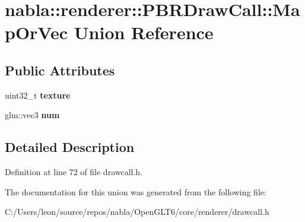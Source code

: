 \hypertarget{unionnabla_1_1renderer_1_1_p_b_r_draw_call_1_1_map_or_vec}{}\section{nabla\+::renderer\+::P\+B\+R\+Draw\+Call\+::Map\+Or\+Vec Union Reference}
\label{unionnabla_1_1renderer_1_1_p_b_r_draw_call_1_1_map_or_vec}
\subsection*{Public Attributes}
\begin{DoxyCompactItemize}
\item 
\mbox{\label{unionnabla_1_1renderer_1_1_p_b_r_draw_call_1_1_map_or_vec_aa236c46d7e6d9e0082750c23fa6f1032}} 
uint32\+\_\+t {\bfseries texture}
\item 
\mbox{\label{unionnabla_1_1renderer_1_1_p_b_r_draw_call_1_1_map_or_vec_a7c1648639446b1d83b3bab69740503d4}} 
glm\+::vec3 {\bfseries num}
\end{DoxyCompactItemize}


\subsection{Detailed Description}


Definition at line 72 of file drawcall.\+h.



The documentation for this union was generated from the following file\+:\begin{DoxyCompactItemize}
\item 
C\+:/\+Users/leon/source/repos/nabla/\+Open\+G\+L\+T6/core/renderer/drawcall.\+h\end{DoxyCompactItemize}
